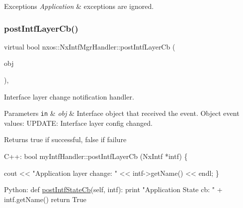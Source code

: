 \begin{DoxyExceptions}{Exceptions}
{\em Application} & exceptions are ignored. \\
\hline
\end{DoxyExceptions}
\mbox{\label{classnxos_1_1_nx_intf_mgr_handler_aca73f02d8ce050cb1bb44fddc6338f76}} 
\subsubsection{\texorpdfstring{post\+Intf\+Layer\+Cb()}{postIntfLayerCb()}}
{\footnotesize\ttfamily virtual bool nxos\+::\+Nx\+Intf\+Mgr\+Handler\+::post\+Intf\+Layer\+Cb (\begin{DoxyParamCaption}\item[{\mbox{\hyperlink{classnxos_1_1_nx_intf}{Nx\+Intf}} $\ast$}]{obj }\end{DoxyParamCaption})\hspace{0.3cm}{\ttfamily [inline]}, {\ttfamily [virtual]}}

Interface layer change notification handler. 
\begin{DoxyParams}[1]{Parameters}
\mbox{\tt in}  & {\em obj} & Interface object that received the event. Object event values\+: U\+P\+D\+A\+TE\+: Interface layer config changed. \\
\hline
\end{DoxyParams}
\begin{DoxyReturn}{Returns}
true if successful, false if failure
\end{DoxyReturn}

\begin{DoxyCode}
C++:
   \textcolor{keywordtype}{bool} 
   myIntfHandler::postIntfLayerCb  (NxIntf *intf)
   \{

       cout << \textcolor{stringliteral}{"Application layer change: "} << 
                  intf->getName() << endl;
   \}

Python:    
   def \mbox{\hyperlink{classnxos_1_1_nx_intf_mgr_handler_a9c3d4d357b1f0ab07558b4611c693755}{postIntfStateCb}}(\textcolor{keyword}{self}, intf):
       print \textcolor{stringliteral}{"Application State cb: "} + intf.getName()
       return True
\end{DoxyCode}



